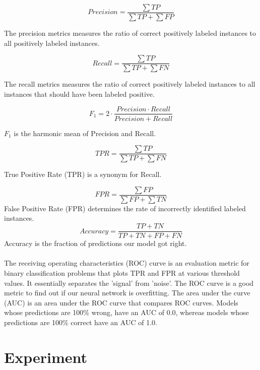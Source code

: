 $${
            Precision = \frac{\sum TP}{\sum TP + \sum FP}
        }
$$

The precision metrics measures the ratio of correct positively labeled instances to all positively labeled instances.

$${
            Recall = \frac{\sum TP}{\sum TP + \sum FN}
        }
$$

The recall metrics measures the ratio of correct positively labeled instances to all instances that should have been labeled positive.

$${
            F_1 = 2 \cdot \frac{Precision \cdot Recall}{Precision + Recall}
        }
$$

$F_1$ is the harmonic mean of Precision and Recall.

$${
            TPR = \frac{\sum TP}{\sum TP + \sum FN}
        }
$$

True Positive Rate (TPR) is a synonym for Recall.

$${
            FPR = \frac{\sum FP}{\sum FP + \sum TN}
        }
$$
False Positive Rate (FPR) determines the rate of incorrectly identified labeled instances.
$${
            Accuracy = \frac{TP + TN}{TP + TN + FP + FN}
        }
$$
Accuracy is the fraction of predictions our model got right.
\\\\
The receiving operating characteristics (ROC) curve is an evaluation metric for binary classification problems that plots TPR and FPR at various threshold values. It essentially separates the 'signal' from 'noise'. The ROC curve is a good metric to find out if our neural network is overfitting. The area under the curve (AUC) is an area under the ROC curve that compares ROC curves. Models whose predictions are 100\% wrong, have an AUC of 0.0, whereas models whose predictions are 100\% correct have an AUC of 1.0.

\section{Experiment}

